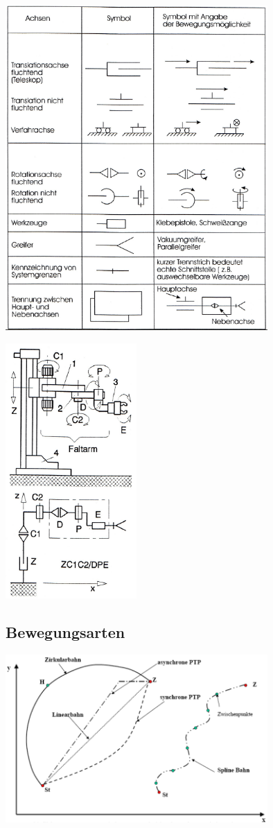 		\begin{minipage}{10cm}
		\includegraphics[width=10cm]{./bilder/symbole.png}
		\end{minipage}
		\begin{minipage}{8cm}
		\includegraphics[width=5cm]{./bilder/symbole-bsp.png}
		\end{minipage}

	\subsection{Bewegungsarten}
		\includegraphics[width=10cm]{./bilder/bewegungsarten.png}
	
